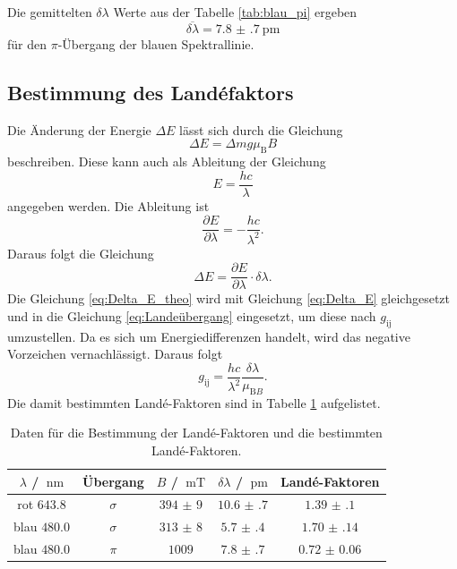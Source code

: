 \FloatBarrier
Die gemittelten $\delta \lambda$ Werte aus der Tabelle \ref{tab:blau_pi} ergeben 
\begin{equation*}
    \overline{\delta\lambda} = \SI{7.8(7)}{\pico\meter}
\end{equation*}
für den $\pi$-Übergang der blauen Spektrallinie.
\subsection{Bestimmung des Landéfaktors}
Die Änderung der Energie $\Delta E$ lässt sich durch die Gleichung 
\begin{equation}
    \label{eq:Delta_E_theo}
    \Delta E = \Delta mg\mu_{\text{B}}B
\end{equation}
beschreiben. 
Diese kann auch als Ableitung der Gleichung
\begin{equation*}
    E = \frac{hc}{\lambda}
\end{equation*}
angegeben werden. 
Die Ableitung ist 
\begin{equation*}
    \frac{\partial E}{\partial \lambda}=-\frac{hc}{\lambda^2}.
\end{equation*}
Daraus folgt die Gleichung 
\begin{equation}
    \label{eq:Delta_E}
    \Delta E =\frac{\partial E}{\partial \lambda}\cdot \delta\lambda.
\end{equation}
Die Gleichung \eqref{eq:Delta_E_theo} wird mit Gleichung \eqref{eq:Delta_E} gleichgesetzt und in die Gleichung \eqref{eq:Landeübergang} eingesetzt, um diese nach $g_{\text{ij}}$ umzustellen. Da es sich um 
Energiedifferenzen handelt, wird das negative Vorzeichen vernachlässigt.
Daraus folgt
\begin{equation}
    \label{eq:g_Bestimmung}
    g_{\text{ij}}=\frac{hc}{\lambda^2}\frac{\delta \lambda}{\mu_{\text{B}B}}.
\end{equation}
Die damit bestimmten Landé-Faktoren sind in Tabelle \ref{tab:exp_lande} aufgelistet.
\FloatBarrier
\begin{table}
    \centering
    \caption{Daten für die Bestimmung der Landé-Faktoren und die bestimmten Landé-Faktoren.}
    \label{tab:exp_lande}
    \begin{tabular}{c c c c c}
        \toprule
        $\lambda$ / $\SI{}{\nano\meter}$&Übergang&$B$ / $\SI{}{\milli\tesla}$&$\delta \lambda$ / $\SI{}{\pico\meter}$&Landé-Faktoren\\
        \midrule
        rot $\num{643.8}$ &$\sigma$ &$\num{394(9)}$ &$\num{10.6(7)}$  &$\num{1.39(10)}$\\
        blau $\num{480.0}$&$\sigma$ &$\num{313(8)}$ &$\num{5.7(4)}$ &$\num{1.70(14)}$\\
        blau $\num{480.0}$&$\pi$    &$\num{1009}$   &$\num{7.8(7)}$  &$\num{0.72(6)}$\\
        \bottomrule
    \end{tabular}
\end{table}